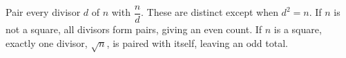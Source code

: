 Pair every divisor $d$ of $n$ with $\dfrac{n}{d}$. These are distinct except when $d^2=n$. If $n$ is not a square, all divisors form pairs, giving an even count. If $n$ is a square, exactly one divisor, $\sqrt n$, is paired with itself, leaving an odd total.
